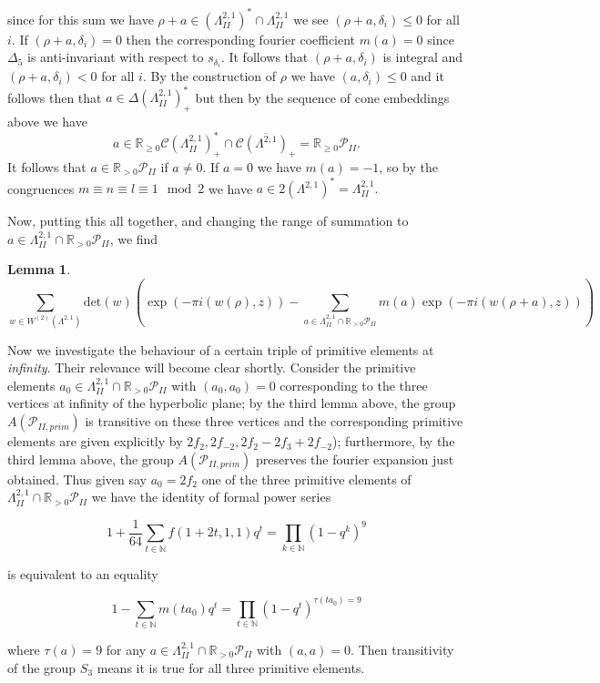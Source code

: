 \documentclass[9pt]{amsart} \usepackage[utf8]{inputenc}
\newtheorem{lemma}{Lemma}
\newcommand{\N}{\mathbb{N}}
\newcommand{\R}{\mathbb{R}} \newcommand{\La}{\Lambda}
\newcommand{\Cone}{\mathcal{C}}
\newcommand{\Poly}{\mathcal{P}}
\begin{document}
since for this sum we have $\rho +a \in (\La^{2,1}_{II})^* \cap
\La^{2,1}_{II}$ we see $(\rho +a, \delta_i) \leq 0$ for all $i$. If
$(\rho + a, \delta_i) = 0$ then the corresponding fourier coefficient
$m(a) = 0$ since $\Delta_5$ is anti-invariant with respect to
$s_{\delta_i}$. It follows that $(\rho +a, \delta_i)$ is integral and
$(\rho +a, \delta_i) < 0$ for all $i$. By the construction of $\rho$ we
have $(a, \delta_i) \leq 0$ and it follows then that $a \in
\Delta(\La^{2,1}_{II})^*_+$ but then by the sequence of cone embeddings
above we have $$a \in \R_{\geq 0} \Cone(\La^{2,1}_{II})_+^* \cap
\overline{\Cone(\La^{2,1})_+} = \R_{\geq 0} \Poly_{II}.$$ It follows
that $a \in \R_{>0}\Poly_{II}$ if $a \neq 0$. If $a = 0$ we have $m(a) =
-1$, so by the congruences $m\equiv n \equiv l \equiv 1 \mod 2$ we have $a \in 2
(\La^{2,1})^* = \La^{2,1}_{II}.$


Now, putting this all together, and changing the range of summation to
$a \in \La^{2,1}_{II} \cap \R_{> 0}\Poly_{II}$, we find
\begin{lemma}
$$\displaystyle\sum_{w \in W^{(2)}(\La^{2,1})} \text{det}(w)( \exp(-\pi
i(w(\rho),z))- \sum_{a \in \La^{2,1}_{II}\cap\R_{>0}\Poly_{II}}
m(a)\exp(-\pi i(w(\rho+a),z)))$$
\end{lemma}

Now we investigate the behaviour of a certain triple of primitive
elements at \textit{infinity}. Their relevance will become clear
shortly. Consider the primitive elements $a_0 \in \La^{2,1}_{II} \cap
\R_{>0} \Poly_{II}$ with $(a_0,a_0) = 0$ corresponding to the three
vertices at infinity of the hyperbolic plane; by the third lemma above, the group
$A(\Poly_{II,prim})$ is transitive on these three vertices and the
corresponding primitive elements are given explicitly by $2f_2, 2f_{-2},
2f_2 - 2f_3 + 2 f_{-2}$); furthermore, by the third lemma above, the
group $A(\Poly_{II,prim})$ preserves the fourier expansion just
obtained. Thus given say $a_0 = 2 f_2$ one of the three primitive
elements of $\La^{2,1}_{II} \cap \R_{>0}\Poly_{II}$ we have the identity
of formal power series

$$1 + \frac{1}{64} \sum_{t \in \N} f(1 + 2t, 1, 1)q^t = \displaystyle\prod_{k\in \N} (1
- q^k)^9$$

is equivalent to an equality

$$ 1 - \sum_{t \in \N} m(t a_0) q^t = \displaystyle\prod_{t\in \N}
(1 - q^t)^{\tau(t a_0) = 9 }$$

where $\tau(a) = 9$ for any  $a \in \La^{2,1}_{II} \cap \R_{>0}
\Poly_{II}$ with $(a,a) = 0$. Then transitivity
of the group $S_3$ means it is true for all three primitive elements.
\end{document}
